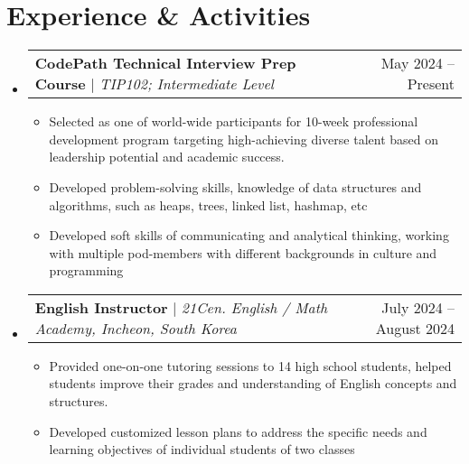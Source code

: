 \documentclass[letterpaper,11pt]{article}
\makeatletter
\newcommand{\resumeItem}[1]{
  \item\small{
    {#1 \vspace{-3pt}}
  }
}
\newcommand{\resumeSubheading}[4]{
  \vspace{-2pt}\item
    \begin{tabular*}{0.97\textwidth}[t]{l@{\extracolsep{\fill}}r@{\hspace{-0.2in}}}
        \textbf{#1} & #2 \\
        \textit{\small#3} & \textit{\small #4} \\
    \end{tabular*}\vspace{-1pt}
}
\newcommand{\resumeProjectHeading}[2]{
    \item
    \begin{tabular*}{0.97\textwidth}{l@{\extracolsep{\fill}}r@{\hspace{-0.2in}}}
        \small#1 & #2 \\
    \end{tabular*}\vspace{-7pt}
}
\newcommand{\resumeSubHeadingListStart}{\begin{itemize}[leftmargin=0.00in, rightmargin=-0.2in, label={}]}
\newcommand{\resumeSubHeadingListEnd}{\end{itemize}}
\newcommand{\resumeItemListStart}{\begin{itemize}[leftmargin=0.15in, rightmargin=0.15in]}
\newcommand{\resumeItemListEnd}{\end{itemize}\vspace{-7pt}}
\makeatother
\begin{document}



\section{Experience \& Activities}
    \resumeSubHeadingListStart
        \resumeProjectHeading
            {\textbf{CodePath Technical Interview Prep Course} $|$ \emph{TIP102; Intermediate Level}}{May 2024 -- Present}
            \resumeItemListStart
                \resumeItem{Selected as one of world-wide participants for 10-week professional development program targeting high-achieving diverse talent based on leadership potential and academic success.}
                \resumeItem{Developed problem-solving skills, knowledge of data structures and algorithms, such as heaps, trees, linked list, hashmap, etc}
                \resumeItem{Developed soft skills of communicating and analytical thinking, working with multiple pod-members with different backgrounds in culture and programming}
                \resumeItemListEnd
        \resumeSubHeadingListEnd

    \resumeSubHeadingListStart
        \resumeProjectHeading
            {\textbf{English Instructor} $|$ \emph{21Cen. English / Math Academy, Incheon, South Korea}}{July 2024 -- August 2024}
            \resumeItemListStart
                \resumeItem{Provided one-on-one tutoring sessions to 14 high school students, helped students improve their grades and understanding of English concepts and structures.}
                \resumeItem{Developed customized lesson plans to address the specific needs and learning objectives of individual students of two classes}
            \resumeItemListEnd
        \resumeSubHeadingListEnd
\end{document}

